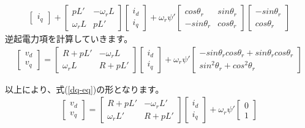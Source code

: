 \begin{fleqn}[8pt]
{\begin{align*}
\begin{bmatrix}
        i_{q}
    \end{bmatrix}
    +
    \begin{bmatrix}
    pL' & - \omega_{r} L \\
    \omega_{r} L & pL'
    \end{bmatrix}
    \begin{bmatrix}
        i_{d} \\
        i_{q}
    \end{bmatrix}
    + \omega_{r}\psi'
    \begin{bmatrix}
        cos\theta_{r} & sin\theta_{r} \\
        -sin\theta_{r} & cos\theta_{r}
    \end{bmatrix}
    \begin{bmatrix}
        -sin\theta_{r} \\
        cos\theta_{r}
    \end{bmatrix}
\end{align*}
}
逆起電力項を計算していきます。
{\large
\begin{align*}
    \begin{bmatrix}
        v_{d} \\
        v_{q}
    \end{bmatrix}
    =
    \begin{bmatrix}
    R+pL' & - \omega_{r} L \\
    \omega_{r} L & R+pL'
    \end{bmatrix}
    \begin{bmatrix}
        i_{d} \\
        i_{q}
    \end{bmatrix}
    + \omega_{r}\psi'
    \begin{bmatrix}
        -sin\theta_{r}cos\theta_{r} + sin\theta_{r}cos\theta_{r} \\
        sin^{2}\theta_{r} + cos^{2}\theta_{r}
    \end{bmatrix}
\end{align*}
}
\end{fleqn}
以上により、式(\ref{dq-eq})の形となります。
{\large
\begin{align*}
    \begin{bmatrix}
        v_{d} \\
        v_{q}
    \end{bmatrix}
    =
    \begin{bmatrix}
        R+pL' & -\omega_{r}L' \\
        \omega_{r}L' & R+pL'
    \end{bmatrix}
    \begin{bmatrix}
        i_{d} \\
        i_{q}
    \end{bmatrix}
    + \omega_{r}\psi'
    \begin{bmatrix}
        0 \\
        1
    \end{bmatrix}
\end{align*}
}
